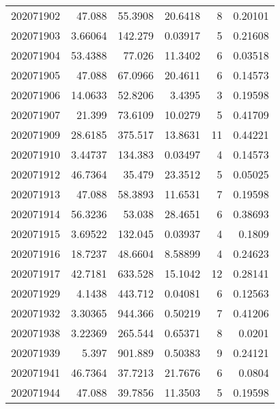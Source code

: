\begin{tabular}{rrrrrr}
 202071902 &         47.088   &       55.3908 &           20.6418  &           8 & 0.20101 \\
 202071903 &          3.66064 &      142.279  &            0.03917 &           5 & 0.21608 \\
 202071904 &         53.4388  &       77.026  &           11.3402  &           6 & 0.03518 \\
 202071905 &         47.088   &       67.0966 &           20.4611  &           6 & 0.14573 \\
 202071906 &         14.0633  &       52.8206 &            3.4395  &           3 & 0.19598 \\
 202071907 &         21.399   &       73.6109 &           10.0279  &           5 & 0.41709 \\
 202071909 &         28.6185  &      375.517  &           13.8631  &          11 & 0.44221 \\
 202071910 &          3.44737 &      134.383  &            0.03497 &           4 & 0.14573 \\
 202071912 &         46.7364  &       35.479  &           23.3512  &           5 & 0.05025 \\
 202071913 &         47.088   &       58.3893 &           11.6531  &           7 & 0.19598 \\
 202071914 &         56.3236  &       53.038  &           28.4651  &           6 & 0.38693 \\
 202071915 &          3.69522 &      132.045  &            0.03937 &           4 & 0.1809  \\
 202071916 &         18.7237  &       48.6604 &            8.58899 &           4 & 0.24623 \\
 202071917 &         42.7181  &      633.528  &           15.1042  &          12 & 0.28141 \\
 202071929 &          4.1438  &      443.712  &            0.04081 &           6 & 0.12563 \\
 202071932 &          3.30365 &      944.366  &            0.50219 &           7 & 0.41206 \\
 202071938 &          3.22369 &      265.544  &            0.65371 &           8 & 0.0201  \\
 202071939 &          5.397   &      901.889  &            0.50383 &           9 & 0.24121 \\
 202071941 &         46.7364  &       37.7213 &           21.7676  &           6 & 0.0804  \\
 202071944 &         47.088   &       39.7856 &           11.3503  &           5 & 0.19598 \\

\end{tabular}
